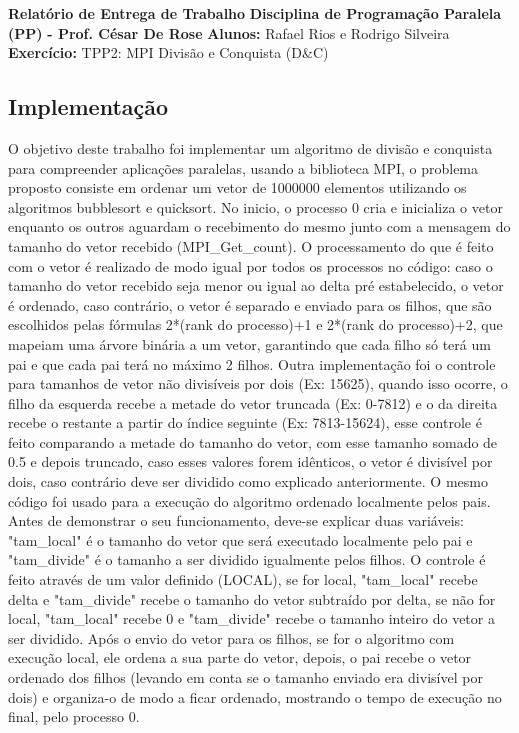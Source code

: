 \documentclass{article}
\begin{document}
\textbf{Relatório de Entrega de Trabalho} \newline
\textbf{Disciplina de Programação Paralela (PP)}\textbf{ - Prof. César De Rose} \newline
\textbf{Alunos:} Rafael Rios e Rodrigo Silveira \newline
\textbf{Exercício:} TPP2: MPI Divisão e Conquista (D\&C) \newline

\begin{multicols*}{2}

\section{Implementação}
O objetivo deste trabalho foi implementar um algoritmo de divisão e conquista para compreender aplicações paralelas, usando a biblioteca MPI, o problema proposto consiste em ordenar um vetor de 1000000 elementos utilizando os algoritmos bubblesort e quicksort. No inicio, o processo 0 cria e inicializa o vetor enquanto os outros aguardam o recebimento do mesmo junto com a mensagem do tamanho do vetor recebido (MPI\_Get\_count). O processamento do que é feito com o vetor é realizado de modo igual por todos os processos no código: caso o tamanho do vetor recebido seja menor ou igual ao delta pré estabelecido, o vetor é ordenado, caso contrário, o vetor é separado e enviado para os filhos, que são escolhidos pelas fórmulas 2*(rank do processo)+1 e 2*(rank do processo)+2, que mapeiam uma árvore binária a um vetor, garantindo que cada filho só terá um pai e que cada pai terá no máximo 2 filhos. Outra implementação foi o controle para tamanhos de vetor não divisíveis por dois (Ex: 15625), quando isso ocorre, o filho da esquerda recebe a metade do vetor truncada (Ex: 0-7812) e o da direita recebe o restante a partir do índice seguinte (Ex: 7813-15624), esse controle é feito comparando a metade do tamanho do vetor, com esse tamanho somado de 0.5 e depois truncado, caso esses valores forem idênticos, o vetor é divisível por dois, caso contrário deve ser dividido como explicado anteriormente. O mesmo código foi usado para a execução do algoritmo ordenado localmente pelos pais. Antes de demonstrar o seu funcionamento, deve-se explicar duas variáveis: "tam\_local" é o tamanho do vetor que será executado localmente pelo pai e "tam\_divide" é o tamanho a ser dividido igualmente pelos filhos. O controle é feito através de um valor definido (LOCAL), se for local, "tam\_local" recebe delta e "tam\_divide" recebe o tamanho do vetor subtraído por delta, se não for local, "tam\_local" recebe 0 e "tam\_divide" recebe o tamanho inteiro do vetor a ser dividido. Após o envio do vetor para os filhos, se for o algoritmo com execução local, ele ordena a sua parte do vetor, depois, o pai recebe o vetor ordenado dos filhos (levando em conta se o tamanho enviado era divisível por dois) e organiza-o de modo a ficar ordenado, mostrando o tempo de execução no final, pelo processo 0.

\end{multicols*}
\end{document}
